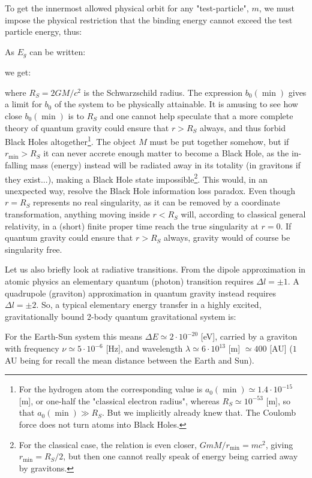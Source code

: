 	To get the innermost allowed physical orbit for any "test-particle", $m$, we must impose the physical restriction that the binding energy cannot exceed the test particle energy, thus:
	
	As $E_g$ can be written:
	
	we get:
	
	where $R_S = 2GM/c^2$ is the Schwarzschild radius. The expression $b_0 (\min)$ gives a limit for $b_0$ of the system to be physically attainable. It is amusing to see how close $b_0 (\min)$ is to $R_S$ and one cannot help speculate that a more complete theory of quantum gravity could ensure that $r> R_S$ always, and thus forbid Black Holes altogether\footnote{For the hydrogen atom the corresponding value is $a_0 (\min) \simeq 1.4 \cdot 10^{-15}$ [m], or one-half the "classical electron radius", whereas $R_S \simeq 10^{-53}$ [m], so that $a_0 (\min) \gg R_S$. But we implicitly already knew that. The Coulomb force does not turn atoms into Black Holes.}. The object $M$ must be put together somehow, but if $r_{\min} > R_S$ it can never accrete enough matter to become a Black Hole, as the in-falling mass (energy) instead will be radiated away in its totality (in gravitons if they exist...), making a Black Hole state impossible\footnote{For the classical case, the relation is even closer, $GmM/r_{\min} = mc^2$, giving $r_{\min} = R_S /2$, but then	one cannot really speak of energy being carried away by gravitons.}. This would, in an unexpected way, resolve the Black Hole information loss paradox. Even though $r=R_S$ represents no real singularity, as it can be removed by a coordinate transformation, anything moving inside $r < R_S$ will, according to classical general relativity, in a (short) finite proper time reach the true singularity at $r=0$. If quantum	gravity could ensure that $r > R_S$ always, gravity would of course be singularity free.
	
	Let us also briefly look at radiative transitions. From the dipole 	approximation in atomic physics an elementary quantum (photon) transition requires $\Delta l = \pm 1$. A quadrupole (graviton) approximation in quantum gravity instead requires $\Delta l = \pm 2$. So, a typical elementary energy transfer in a highly excited, gravitationally bound 2-body quantum gravitational system is:
	
	For the Earth-Sun system this means $\Delta E \simeq 2 \cdot 10^{-20}$ [eV], carried by a graviton with frequency $\nu \simeq 5 \cdot 10^{-6}$ [Hz], and wavelength $\lambda \simeq 6 \cdot 10^{13}$ [m] $\simeq 400$ [AU] ($1$ AU being for recall the mean distance between the Earth and Sun).
	
